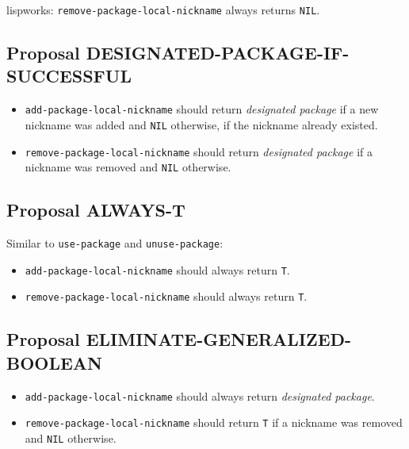 \documentclass[11pt]{article}
\begin{document}
lispworks:
  \texttt{remove-package-local-nickname} always returns \texttt{NIL}.
\subsection{Proposal DESIGNATED-PACKAGE-IF-SUCCESSFUL}
\label{sec:org335dc3d}
\begin{itemize}
\item \texttt{add-package-local-nickname} should return \emph{designated package} if a new nickname
was added and \texttt{NIL} otherwise, if the nickname already existed.
\item \texttt{remove-package-local-nickname} should return \emph{designated package} if a nickname
was removed and \texttt{NIL} otherwise.
\end{itemize}
\subsection{Proposal ALWAYS-T}
\label{sec:orgd55c132}
Similar to \texttt{use-package} and \texttt{unuse-package}:
\begin{itemize}
\item \texttt{add-package-local-nickname} should always return \texttt{T}.
\item \texttt{remove-package-local-nickname} should always return \texttt{T}.
\end{itemize}
\subsection{Proposal ELIMINATE-GENERALIZED-BOOLEAN}
\label{sec:org5cca898}
\begin{itemize}
\item \texttt{add-package-local-nickname} should always return \emph{designated package}.
\item \texttt{remove-package-local-nickname} should return \texttt{T} if a nickname was removed and
\texttt{NIL} otherwise.
\end{itemize}
\end{document}
